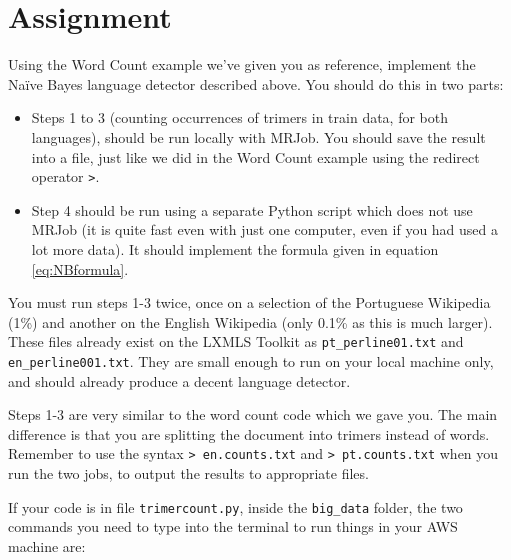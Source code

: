 \section{Assignment}

Using the Word Count example we've given you as reference, implement the Na\"{i}ve Bayes language detector described above. You should do this in two parts:

\begin{itemize}
	\item Steps 1 to 3 (counting occurrences of trimers in train data, for both languages), should be run locally with MRJob. You should save the result into a file, just like we did in the Word Count example using the redirect operator \texttt{>}.
	\item Step 4 should be run using a separate Python script which does not use MRJob (it is quite fast even with just one computer, even if you had used a lot more data). It should implement the formula given in equation \eqref{eq:NBformula}.
\end{itemize}

%
%
%
%

You must run steps 1-3 twice, once on a selection of the Portuguese Wikipedia (1\%) and
another on the English Wikipedia (only 0.1\% as this is much larger). These files already exist on the LXMLS Toolkit as \texttt{pt\_perline01.txt} and \texttt{en\_perline001.txt}. They are small enough to run on your local machine only, and should already produce a decent language detector.

Steps 1-3 are very similar to the word count code which we gave you. The main difference is that you are splitting the document into trimers instead of words. Remember to use the syntax \texttt{> en.counts.txt} and \texttt{> pt.counts.txt} when you run the two jobs, to output the results to appropriate files.

If your code is in file \texttt{trimercount.py}, inside the \texttt{big\_data} folder, the two commands you need to type into the terminal to run things in your AWS machine are:

